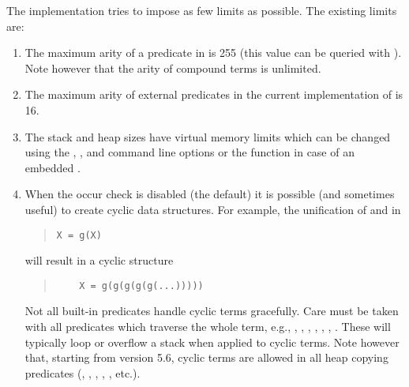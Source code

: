 The {\eclipse} implementation tries to impose as few limits as possible.
The existing limits are:
\begin{enumerate}
\item The maximum arity of a predicate in {\eclipse} is 255
(this value can be queried with ).
Note however that the arity of compound terms is unlimited.

\item The maximum arity of external predicates in the current implementation
of {\eclipse} is 16.

\item The stack and heap sizes have virtual memory limits which can be
changed using the , ,  and 
command line options or the  function in case of an
embedded {\eclipse}.

\item {}When the occur check is disabled (the default)
it is possible (and sometimes useful) to create cyclic data structures.
For example, the unification of  and  in
\begin{quote}
\begin{verbatim}
X = g(X)
\end{verbatim}
\end{quote}
will result in a cyclic structure
\begin{quote}
\begin{verbatim}
    X = g(g(g(g(g(...)))))
\end{verbatim}
\end{quote}
Not all {\eclipse} built-in predicates handle cyclic terms gracefully.
Care must be taken with all predicates which traverse the whole term, e.g.,
,
,
,
,
,
,
.
These will typically loop or overflow a stack when applied to cyclic terms.
Note however that, starting from version 5.6, cyclic terms are allowed in all
heap copying predicates (, ,
, , , etc.).

\end{enumerate}
